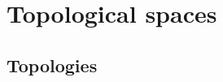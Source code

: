 \chapter{Topological spaces}\label{chp:topological-spaces}

\section{Topologies}\label{sec:topologies}
